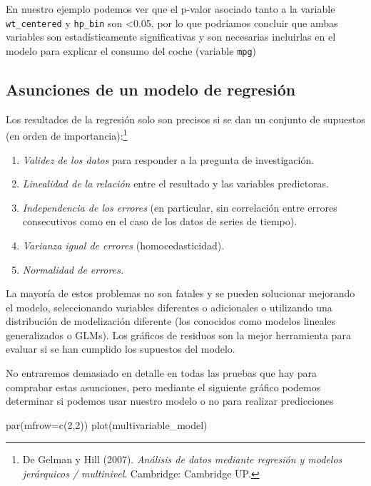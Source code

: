\documentclass[
]{book}
\newenvironment{Shaded}{\begin{snugshade}}{\end{snugshade}}
\newcommand{\AttributeTok}[1]{\textcolor[rgb]{0.77,0.63,0.00}{#1}}
\newcommand{\DecValTok}[1]{\textcolor[rgb]{0.00,0.00,0.81}{#1}}
\newcommand{\FunctionTok}[1]{\textcolor[rgb]{0.00,0.00,0.00}{#1}}
\newcommand{\NormalTok}[1]{#1}
\begin{document}
En nuestro ejemplo podemos ver que el p-valor asociado tanto a la variable \texttt{wt\_centered} y \texttt{hp\_bin} son \textless0.05, por lo que podríamos concluir que ambas variables son estadísticamente significativas y son necesarias incluirlas en el modelo para explicar el consumo del coche (variable \texttt{mpg})

\hypertarget{asunciones-de-un-modelo-de-regresiuxf3n}{%
\subsection{Asunciones de un modelo de regresión}\label{asunciones-de-un-modelo-de-regresiuxf3n}}

Los resultados de la regresión solo son precisos si se dan un conjunto de supuestos (en orden de importancia):\footnote{De Gelman y Hill (2007). \emph{Análisis de datos mediante regresión y modelos jerárquicos / multinivel}. Cambridge: Cambridge UP.}

\begin{enumerate}
\def\labelenumi{\arabic{enumi}.}
\item
  \emph{Validez de los datos} para responder a la pregunta de investigación.
\item
  \emph{Linealidad de la relación} entre el resultado y las variables predictoras.
\item
  \emph{Independencia de los errores} (en particular, sin correlación entre errores consecutivos como en el caso de los datos de series de tiempo).
\item
  \emph{Varianza igual de errores} (homocedasticidad).
\item
  \emph{Normalidad de errores.}
\end{enumerate}

La mayoría de estos problemas no son fatales y se pueden solucionar mejorando el modelo, seleccionando variables diferentes o adicionales o utilizando una distribución de modelización diferente (los conocidos como modelos lineales generalizados o GLMs). Los gráficos de residuos son la mejor herramienta para evaluar si se han cumplido los supuestos del modelo.

No entraremos demasiado en detalle en todas las pruebas que hay para comprabar estas asunciones, pero mediante el siguiente gráfico podemos determinar si podemos usar nuestro modelo o no para realizar predicciones

\begin{Shaded}
\begin{Highlighting}[]
\FunctionTok{par}\NormalTok{(}\AttributeTok{mfrow=}\FunctionTok{c}\NormalTok{(}\DecValTok{2}\NormalTok{,}\DecValTok{2}\NormalTok{))}
\FunctionTok{plot}\NormalTok{(multivariable\_model)}
\end{Highlighting}
\end{Shaded}
\end{document}

